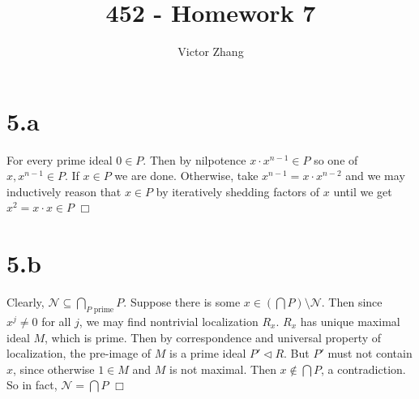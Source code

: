 \documentclass{article}
\title{452 - Homework 7}
\author{Victor Zhang}
\date{}
\begin{document}
\maketitle

\section*{5.a}
For every prime ideal $0 \in P$. Then by nilpotence $x \cdot x^{n-1} \in P$ so one of $x, x^{n-1} \in P$. If $x \in P$ we are done. Otherwise, take $x^{n-1} = x \cdot x^{n-2}$ and we may inductively reason that $x \in P$ by iteratively shedding factors of $x$ until we get $x^2 = x \cdot x \in P$ $\Box$

\section*{5.b}
Clearly, $\mathcal{N} \subseteq \bigcap\limits_{P \text{ prime}} P$. Suppose there is some $x \in (\bigcap P) \setminus \mathcal{N}$. Then since $x^j \neq 0$ for all $j$, we may find nontrivial localization $R_x$. $R_x$ has unique maximal ideal $M$, which is prime. Then by correspondence and universal property of localization, the pre-image of $M$ is a prime ideal $P' \lhd R$. But $P'$ must not contain $x$, since otherwise $1 \in M$ and $M$ is not maximal. Then $x \notin \bigcap P$, a contradiction. So in fact, $\mathcal{N} = \bigcap P$ $\Box$
\end{document}
